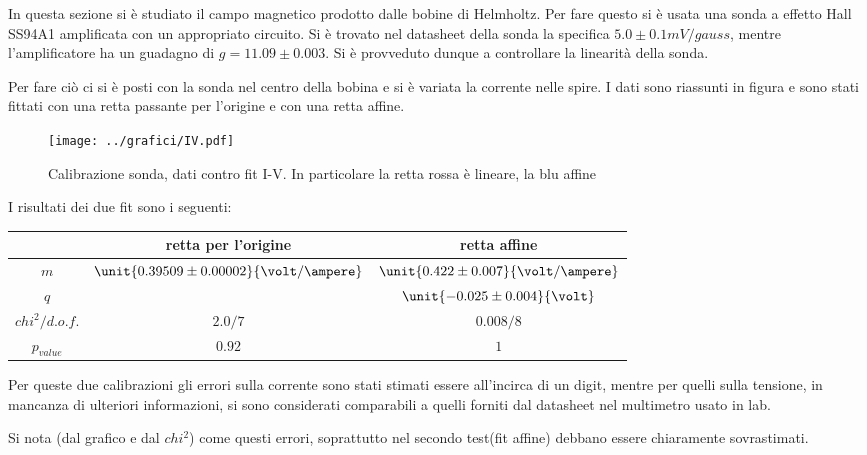 \documentclass[10pt,a4paper]{article}
\begin{document}
In questa sezione si è studiato il campo magnetico prodotto dalle bobine di Helmholtz. Per fare questo si è usata una sonda a effetto Hall SS94A1 amplificata con un appropriato circuito. Si è trovato nel datasheet della sonda la specifica $5.0\pm 0.1 mV/gauss$, mentre l'amplificatore ha un guadagno di $g=11.09\pm0.003$. Si è provveduto dunque a controllare la linearità della sonda.

Per fare ciò ci si è posti con la sonda nel centro della bobina e si è variata la corrente nelle spire. I dati sono riassunti in figura e sono stati fittati con una retta passante per l'origine e con una retta affine. 

\begin{figure}[H]
	\centering
	\texttt{[image: ../grafici/IV.pdf]}
	\caption{Calibrazione sonda, dati contro fit I-V. In particolare la retta rossa è lineare, la blu affine}
	\label{fig:ex1}
\end{figure}

I risultati dei due fit sono i seguenti:

\begin{table}
	\centering
\begin{tabular}{c|c|c}
		& retta per l'origine & retta affine\\
	\hline
	$m$ & $\unit{0.39509 \pm 0.00002}{\volt/\ampere}$ & $\unit{0.422 \pm 0.007}{\volt/\ampere}$ \\
	$q$ & & $\unit{-0.025 \pm 0.004}{\volt}$\\
	$chi^2/d.o.f.$ & $2.0/7$ & $0.008/8$ \\
	$p_{value}$ & $0.92$ & $1$\\
\end{tabular}
\end{table}

Per queste due calibrazioni gli errori sulla corrente sono stati stimati essere all'incirca di un digit, mentre per quelli sulla tensione, in mancanza di ulteriori informazioni, si sono considerati comparabili a quelli forniti dal datasheet nel multimetro usato in lab.

Si nota (dal grafico e dal $chi^2$) come questi errori, soprattutto nel secondo test(fit affine) debbano essere chiaramente sovrastimati.
\end{document}

